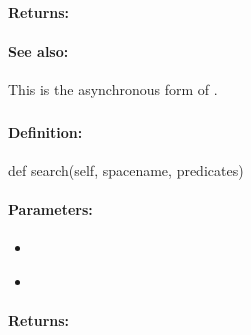 \paragraph{Returns:}


\paragraph{See also:}  This is the asynchronous form of .

\pagebreak
\subsubsection{}
\label{api:python:search}


\paragraph{Definition:}
\begin{pythoncode}
def search(self, spacename, predicates)
\end{pythoncode}

\paragraph{Parameters:}
\begin{itemize}[noitemsep]
\item {}\\

\item {}\\

\end{itemize}

\paragraph{Returns:}


\pagebreak
\subsubsection{}
\label{api:python:sorted_search}


